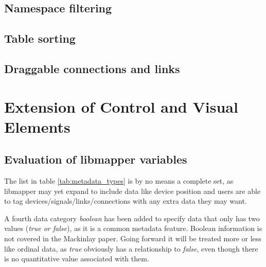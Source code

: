 	\subsection{Namespace filtering} %
	\label{sub:namespace_filtering}
	

	\subsection{Table sorting} %
	\label{sub:table_sorting}
	

	\subsection{Draggable connections and links} %
	\label{sub:draggable_connections_and_links}
	


\section{Extension of Control and Visual Elements} %
\label{sec:extension_of_control_and_visual_elements}

	\subsection{Evaluation of libmapper variables} %
	\label{sec:evaluation_of_libmapper_variables}

The list in table \ref{tab:metadata_types} is by no means a complete set, as libmapper may yet expand to include data like device position and users are able to tag devices/signals/links/connections with any extra data they may want.

A fourth data category \emph{boolean} has been added to specify data that only has two values (\emph{true or false}), as it is a common metadata feature. Boolean information is not covered in the Mackinlay paper. Going forward it will be treated more or less like ordinal data, as \emph{true} obviously has a relationship to \emph{false}, even though there is no quantitative value associated with them.



